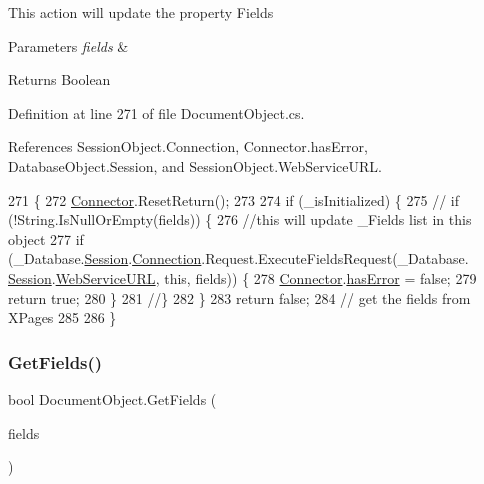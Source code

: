 This action will update the property \textquotesingle{}Fields\textquotesingle{}


\begin{DoxyParams}{Parameters}
{\em fields} & \\
\hline
\end{DoxyParams}
\begin{DoxyReturn}{Returns}
Boolean
\end{DoxyReturn}


Definition at line 271 of file Document\+Object.\+cs.



References Session\+Object.\+Connection, Connector.\+has\+Error, Database\+Object.\+Session, and Session\+Object.\+Web\+Service\+U\+RL.


\begin{DoxyCode}
271                                          \{
272         \hyperlink{class_connector}{Connector}.ResetReturn();
273 
274         \textcolor{keywordflow}{if} (\_isInitialized) \{
275             \textcolor{comment}{// if (!String.IsNullOrEmpty(fields)) \{}
276             \textcolor{comment}{//this will update \_Fields list in this object}
277             \textcolor{keywordflow}{if} (\_Database.\hyperlink{class_database_object_aa8484162b7d2a7c4c9426bca13c64c07}{Session}.\hyperlink{class_session_object_a014bdbf705a753540e19bfb53030c55c}{Connection}.Request.ExecuteFieldsRequest(\_Database.
      \hyperlink{class_database_object_aa8484162b7d2a7c4c9426bca13c64c07}{Session}.\hyperlink{class_session_object_a697c071c812fbf7ad1166b896fb44c16}{WebServiceURL}, \textcolor{keyword}{this}, fields)) \{
278                 \hyperlink{class_connector}{Connector}.\hyperlink{class_connector_a079bae21a5417efa53bfe8954c0f533f}{hasError} = \textcolor{keyword}{false};
279                 \textcolor{keywordflow}{return} \textcolor{keyword}{true};
280             \}
281             \textcolor{comment}{//\}}
282         \}
283         \textcolor{keywordflow}{return} \textcolor{keyword}{false};
284         \textcolor{comment}{// get the fields from XPages}
285 
286     \}
\end{DoxyCode}
\mbox{\label{class_document_object_a8e38704e02850b2480d29d184ae2c0e0}} 
\subsubsection{\texorpdfstring{Get\+Fields()}{GetFields()}\hspace{0.1cm}{\footnotesize\ttfamily [2/2]}}
{\footnotesize\ttfamily bool Document\+Object.\+Get\+Fields (\begin{DoxyParamCaption}\item[{I\+List}]{fields }\end{DoxyParamCaption})}



